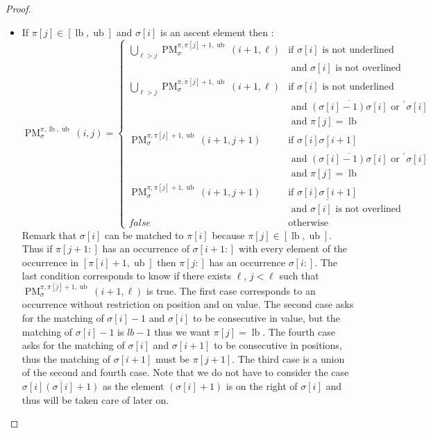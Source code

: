 \documentclass[a4paper]{llncs}
\newcommand{\ptext}{\pi}
\newcommand{\ppattern}{\sigma}
\DeclareMathOperator{\PMa}{PM}
\newcommand{\PM}[6]{\PMa_{{#1}}^{{#2},{#3},{#4}}({#5},{#6})}
\DeclareMathOperator{\lb}{lb}
\DeclareMathOperator{\ub}{ub}
\begin{document}
\begin{proof}
\begin{itemize}
	\item If $\ptext[j] \in [\lb,\ub]$ and $\ppattern[i]$ is an ascent element then :
	$$
	\PM{\sigma}{\ptext}{\lb}{\ub}{i}{j}=
	\begin{cases}
		\bigcup_{\ell>j} \PM{\sigma}{\ptext}{\ptext[j]+1}{\ub}{i+1}{\ell}
			& \text{if $\ppattern[i]$ is not underlined } \\
			& \text{ and $\ppattern[i]$ is not overlined} \\
		\bigcup_{\ell>j} \PM{\sigma}{\ptext}{\ptext[j]+1}{\ub}{i+1}{\ell}
			& \text{if $\ppattern[i]$ is not underlined } \\
			& \text{ and $\overline{(\ppattern[i]-1)\ppattern[i]}$ or $^\ulcorner{\ppattern[i]}$}\\
			& \text{ and $\ptext[j]=\lb$} \\
		\PM{\sigma}{\ptext}{\ptext[j]+1}{\ub}{i+1}{j+1}
			& \text{if $\underline{\ppattern[i]\ppattern[i+1]}$ } \\
			& \text{ and $\overline{(\ppattern[i]-1)\ppattern[i]}$ or $^\ulcorner{\ppattern[i]}$}\\
			& \text{ and $\ptext[j]=\lb$} \\
		\PM{\sigma}{\ptext}{\ptext[j]+1}{\ub}{i+1}{j+1}
			& \text{if $\underline{\ppattern[i]\ppattern[i+1]}$ } \\
			& \text{ and $\ppattern[i]$ is not overlined} \\
		false & \text{otherwise}

	\end{cases}
	$$	
	Remark that $\ppattern[i]$  can be matched to $\pi[i]$ because $\ptext[j] \in [\lb,\ub]$.
	Thus if $\ptext[j+1:]$ has an occurrence of $\ppattern[i+1:]$  with every element of the occurrence in $[\pi[i]+1,\ub]$ then 
 	$\ptext[j:]$ has an occurrence $\ppattern[i:]$. The last condition corresponds 
 	to know if there exists $\ell$, $j<\ell$ such that
	$\PM{\sigma}{\ptext}{\ptext[j]+1}{\ub}{i+1}{\ell}$ is true.
	The first case corresponds to an occurrence without restriction on position and on value. The second case asks for the matching of $\ppattern[i]-1$ and $\ppattern[i]$ to be consecutive in value, but the matching of $\ppattern[i]-1$
	is $lb-1$ thus we want $\ptext[j]=\lb$. The fourth case asks for the matching of $\ppattern[i]$ and $\ppattern[i+1]$ to be consecutive in positions, thus the matching of $\ppattern[i+1]$ must be $\pi[j+1]$. The third case is a union of the second and fourth case. 
	Note that we do not have to consider the case $\overline{\ppattern[i](\ppattern[i]+1)}$
	as the element $(\ppattern[i]+1)$ is on the right of $\ppattern[i]$ and thus will
	be taken care of later on.
	

\end{itemize}
\end{proof}
\end{document}
